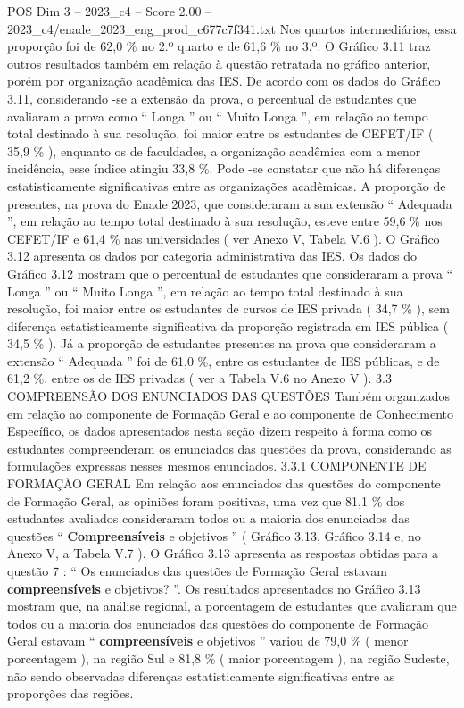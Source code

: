 \begin{textsample}{POS Dim 3 – 2023\_c4 – Score 2.00 – 2023\_c4/enade\_2023\_eng\_prod\_c677c7f341.txt}
Nos quartos intermediários, essa proporção foi de 62,0 \% no 2.º quarto e de 61,6 \% no 3.º.
O Gráfico 3.11 traz outros resultados também em relação à questão retratada no gráfico anterior, porém por organização acadêmica das IES.
De acordo com os dados do Gráfico 3.11, considerando -se a extensão da prova, o percentual de estudantes que avaliaram a prova como “ Longa ” ou “ Muito Longa ”, em relação ao tempo total destinado à sua resolução, foi maior entre os estudantes de CEFET/IF ( 35,9 \% ), enquanto os de faculdades, a organização acadêmica com a menor incidência, esse índice atingiu 33,8 \%.
Pode -se constatar que não há diferenças estatisticamente significativas entre as organizações acadêmicas.
A proporção de presentes, na prova do Enade 2023, que consideraram a sua extensão “ Adequada ”, em relação ao tempo total destinado à sua resolução, esteve entre 59,6 \% nos CEFET/IF e 61,4 \% nas universidades ( ver Anexo V, Tabela V.6 ).
O Gráfico 3.12 apresenta os dados por categoria administrativa das IES.
Os dados do Gráfico 3.12 mostram que o percentual de estudantes que consideraram a prova “ Longa ” ou “ Muito Longa ”, em relação ao tempo total destinado à sua resolução, foi maior entre os estudantes de cursos de IES privada ( 34,7 \% ), sem diferença estatisticamente significativa da proporção registrada em IES pública ( 34,5 \% ).
Já a proporção de estudantes presentes na prova que consideraram a extensão “ Adequada ” foi de 61,0 \%, entre os estudantes de IES públicas, e de 61,2 \%, entre os de IES privadas ( ver a Tabela V.6 no Anexo V ). 3.3 COMPREENSÃO DOS ENUNCIADOS DAS QUESTÕES Também organizados em relação ao componente de Formação Geral e ao componente de Conhecimento Específico, os dados apresentados nesta seção dizem respeito à forma como os estudantes compreenderam os enunciados das questões da prova, considerando as formulações expressas nesses mesmos enunciados. 3.3.1 COMPONENTE DE FORMAÇÃO GERAL Em relação aos enunciados das questões do componente de Formação Geral, as opiniões foram positivas, uma vez que 81,1 \% dos estudantes avaliados consideraram todos ou a maioria dos enunciados das questões “ \textbf{Compreensíveis} e objetivos ” ( Gráfico 3.13, Gráfico 3.14 e, no Anexo V, a Tabela V.7 ).
O Gráfico 3.13 apresenta as respostas obtidas para a questão 7 : “ Os enunciados das questões de Formação Geral estavam \textbf{compreensíveis} e objetivos? ”.
Os resultados apresentados no Gráfico 3.13 mostram que, na análise regional, a porcentagem de estudantes que avaliaram que todos ou a maioria dos enunciados das questões do componente de Formação Geral estavam “ \textbf{compreensíveis} e objetivos ” variou de 79,0 \% ( menor porcentagem ), na região Sul e 81,8 \% ( maior porcentagem ), na região Sudeste, não sendo observadas diferenças estatisticamente significativas entre as proporções das regiões.

\end{textsample}
